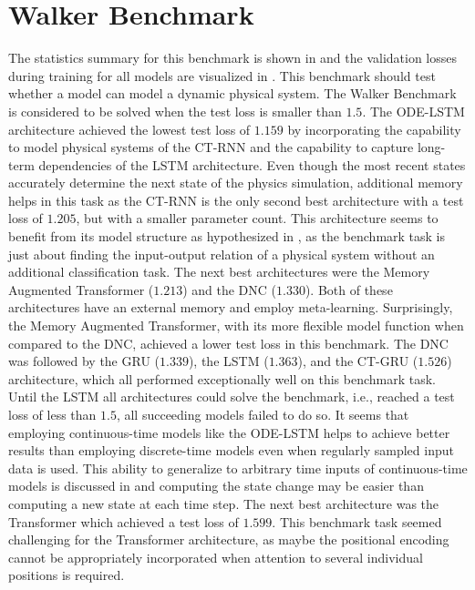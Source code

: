 \documentclass[draft,final]{vutinfth} %
\begin{document}
    \section{Walker Benchmark} \label{walker_results}
    The statistics summary for this benchmark is shown in  and the validation losses during training for all models are visualized in .
    This benchmark should test whether a model can model a dynamic physical system.
    The Walker Benchmark is considered to be solved when the test loss is smaller than $1.5$.
    The ODE-LSTM architecture achieved the lowest test loss of $1.159$ by incorporating the capability to model physical systems of the CT-RNN and the capability to capture long-term dependencies of the LSTM architecture.
    Even though the most recent states accurately determine the next state of the physics simulation, additional memory helps in this task as the CT-RNN is the only second best architecture with a test loss of $1.205$, but with a smaller parameter count.
    This architecture seems to benefit from its model structure as hypothesized in , as the benchmark task is just about finding the input-output relation of a physical system without an additional classification task.
    The next best architectures were the Memory Augmented Transformer ($1.213$) and the DNC ($1.330$).
    Both of these architectures have an external memory and employ meta-learning.
    Surprisingly, the Memory Augmented Transformer, with its more flexible model function when compared to the DNC, achieved a lower test loss in this benchmark.
    The DNC was followed by the GRU ($1.339$), the LSTM ($1.363$), and the CT-GRU ($1.526$) architecture, which all performed exceptionally well on this benchmark task.
    Until the LSTM all architectures could solve the benchmark, i.e., reached a test loss of less than $1.5$, all succeeding models failed to do so.
    It seems that employing continuous-time models like the ODE-LSTM helps to achieve better results than employing discrete-time models even when regularly sampled input data is used.
    This ability to generalize to arbitrary time inputs of continuous-time models is discussed in  and computing the state change may be easier than computing a new state at each time step.
    The next best architecture was the Transformer which achieved a test loss of $1.599$.
    This benchmark task seemed challenging for the Transformer architecture, as maybe the positional encoding cannot be appropriately incorporated when attention to several individual positions is required.
\end{document}
